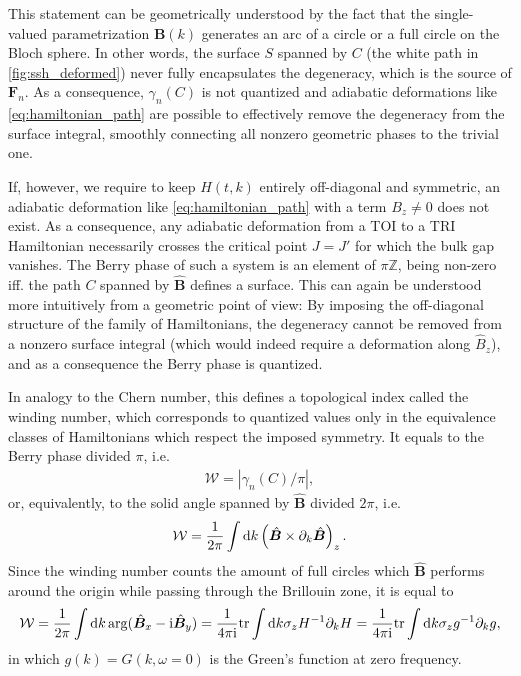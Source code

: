 This statement can be geometrically understood by the fact that the single-valued parametrization $\bm B(k)$ generates an arc of a circle or a full circle on the Bloch sphere.
In other words, the surface $S$ spanned by $C$ (the white path in \cref{fig:ssh_deformed}) never fully encapsulates the degeneracy, which is the source of ${\bm F}_n$.
As a consequence, $\gamma_n(C)$ is not quantized and adiabatic deformations like \cref{eq:hamiltonian_path} are possible to effectively remove the degeneracy from the surface integral, smoothly connecting all nonzero geometric phases to the trivial one.

If, however, we require to keep $H(t,k)$ entirely off-diagonal and symmetric, an adiabatic deformation like \cref{eq:hamiltonian_path} with a term $B_z\neq0$ does not exist.
As a consequence, any adiabatic deformation from a TOI to a TRI Hamiltonian necessarily crosses the critical point $J=J'$ for which the bulk gap vanishes.
The Berry phase of such a system is an element of $\pi\mathds Z$, being non-zero iff. the path $C$ spanned by $\hat{\bm B}$ defines a surface.
This can again be understood more intuitively from a geometric point of view:
By imposing the off-diagonal structure of the family of Hamiltonians, the degeneracy cannot be removed from a nonzero surface integral (which would indeed require a deformation along $\hat {B}_z$), and as a consequence the Berry phase is quantized.

In analogy to the Chern number, this defines a topological index called the winding number, which corresponds to quantized values only in the equivalence classes of Hamiltonians which respect the imposed symmetry.
It equals to the Berry phase divided $\pi$, i.e.
\begin{align}
    \mathcal W = |\gamma_n(C)/\pi|,
\end{align}
or, equivalently, to the solid angle spanned by $\hat{\bm B}$ divided $2\pi$, i.e.
\begin{align}
    \mathcal W = \frac1{2\pi}\int\mathrm d k\left( \hat{\bm B}\times\partial_k\hat{\bm B} \right)_z.
\end{align}
Since the winding number counts the amount of full circles which $\hat{\bm B}$ performs around the origin while passing through the Brillouin zone, it is equal to
\begin{align}
    \mathcal W = \frac{1}{2\pi}\int\mathrm d k \arg(\hat{\bm B}_x - \mathrm i \hat{\bm B}_y)
    =
    \frac{1}{4\pi\mathrm i} {\rm tr}\int\mathrm d k \sigma_z H^{-1}\partial_k H
    =
    \frac{1}{4\pi\mathrm i} {\rm tr}\int\mathrm d k \sigma_z g^{-1}\partial_k g,
    \label{eq:winding_number}
\end{align}
in which $g(k)=G(k,\omega=0)$ is the Green's function at zero frequency.

